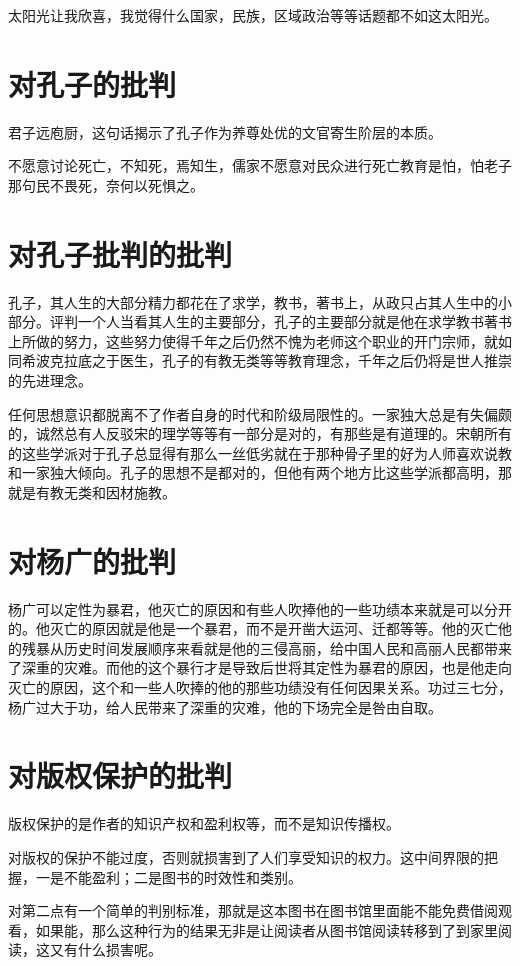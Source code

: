 \documentclass[12pt,oneside]{book}
\begin{document}
太阳光让我欣喜，我觉得什么国家，民族，区域政治等等话题都不如这太阳光。

\chapter{对孔子的批判}
君子远庖厨，这句话揭示了孔子作为养尊处优的文官寄生阶层的本质。

不愿意讨论死亡，不知死，焉知生，儒家不愿意对民众进行死亡教育是怕，怕老子那句民不畏死，奈何以死惧之。

\chapter{对孔子批判的批判}
孔子，其人生的大部分精力都花在了求学，教书，著书上，从政只占其人生中的小部分。评判一个人当看其人生的主要部分，孔子的主要部分就是他在求学教书著书上所做的努力，这些努力使得千年之后仍然不愧为老师这个职业的开门宗师，就如同希波克拉底之于医生，孔子的有教无类等等教育理念，千年之后仍将是世人推崇的先进理念。

任何思想意识都脱离不了作者自身的时代和阶级局限性的。一家独大总是有失偏颇的，诚然总有人反驳宋的理学等等有一部分是对的，有那些是有道理的。宋朝所有的这些学派对于孔子总显得有那么一丝低劣就在于那种骨子里的好为人师喜欢说教和一家独大倾向。孔子的思想不是都对的，但他有两个地方比这些学派都高明，那就是有教无类和因材施教。​

\chapter{对杨广的批判}
杨广可以定性为暴君，他灭亡的原因和有些人吹捧他的一些功绩本来就是可以分开的。他灭亡的原因就是他是一个暴君，而不是开凿大运河、迁都等等。他的灭亡他的残暴从历史时间发展顺序来看就是他的三侵高丽，给中国人民和高丽人民都带来了深重的灾难。而他的这个暴行才是导致后世将其定性为暴君的原因，也是他走向灭亡的原因，这个和一些人吹捧的他的那些功绩没有任何因果关系。功过三七分，杨广过大于功，给人民带来了深重的灾难，他的下场完全是咎由自取。

\chapter{对版权保护的批判}
版权保护的是作者的知识产权和盈利权等，而不是知识传播权。

对版权的保护不能过度，否则就损害到了人们享受知识的权力。这中间界限的把握，一是不能盈利；二是图书的时效性和类别。

对第二点有一个简单的判别标准，那就是这本图书在图书馆里面能不能免费借阅观看，如果能，那么这种行为的结果无非是让阅读者从图书馆阅读转移到了到家里阅读，这又有什么损害呢。
\end{document}
